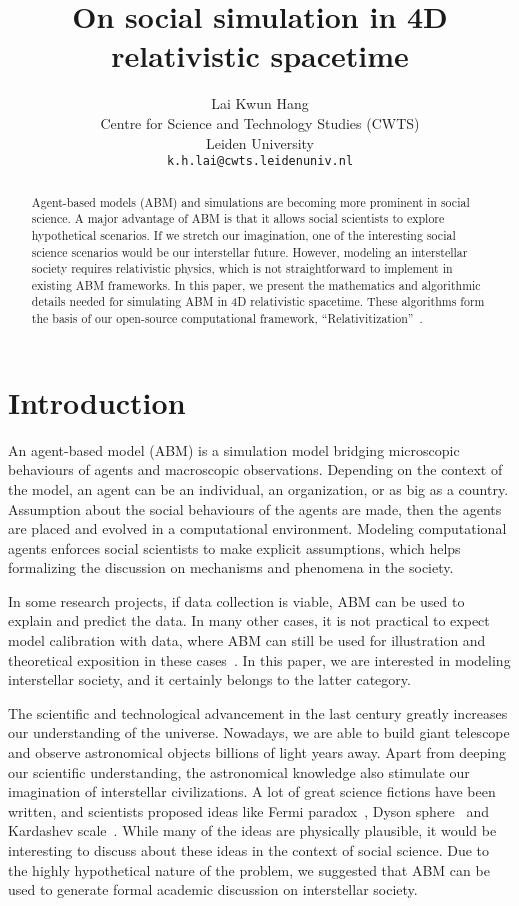 \documentclass{article}
\title{On social simulation in 4D relativistic spacetime}
\author{
	Lai Kwun Hang \\
	Centre for Science and Technology Studies (CWTS) \\
	Leiden University \\
	\texttt{k.h.lai@cwts.leidenuniv.nl} \\
}
\begin{document}
\maketitle

\begin{abstract}
Agent-based models (ABM) and simulations are becoming more prominent in social science.
A major advantage of ABM is that it allows social scientists to explore hypothetical scenarios.
If we stretch our imagination, one of the interesting social science scenarios would be our interstellar future.
However, modeling an interstellar society requires relativistic physics,
which is not straightforward to implement in existing ABM frameworks.
In this paper, we present the mathematics and algorithmic details needed for simulating ABM in 4D relativistic spacetime.
These algorithms form the basis of our open-source computational framework, ``Relativitization''~\cite{relativitization}.
\end{abstract}




\section{Introduction}
An agent-based model (ABM) is a simulation model bridging microscopic behaviours of agents and macroscopic observations.
Depending on the context of the model, an agent can be an individual, an organization, or as big as a country.
Assumption about the social behaviours of the agents are made, then the agents are placed and evolved
in a computational environment.
Modeling computational agents enforces social scientists to make explicit assumptions,
which helps formalizing the discussion on mechanisms and phenomena in the society.

In some research projects, if data collection is viable, 
ABM can be used to explain and predict the data.
In many other cases, it is not practical to expect model calibration with data,
where ABM can still be used for illustration and theoretical exposition in these cases~\cite{edmonds2015simulating}.
In this paper, we are interested in modeling interstellar society, and it certainly belongs to the latter category.

The scientific and technological advancement in the last century greatly increases our understanding of the universe.
Nowadays, we are able to build giant telescope and observe astronomical objects billions of light years away.
Apart from deeping our scientific understanding, the astronomical knowledge also stimulate our imagination
of interstellar civilizations.
A lot of great science fictions have been written, and scientists proposed ideas like 
Fermi paradox~\cite{gray2015fermi}, Dyson sphere~\cite{wright2020dyson} and Kardashev scale~\cite{gray2020extended}.
While many of the ideas are physically plausible, 
it would be interesting to discuss about these ideas in the context of social science.
Due to the highly hypothetical nature of the problem,
we suggested that ABM can be used to generate formal academic discussion on interstellar society.
\end{document}
